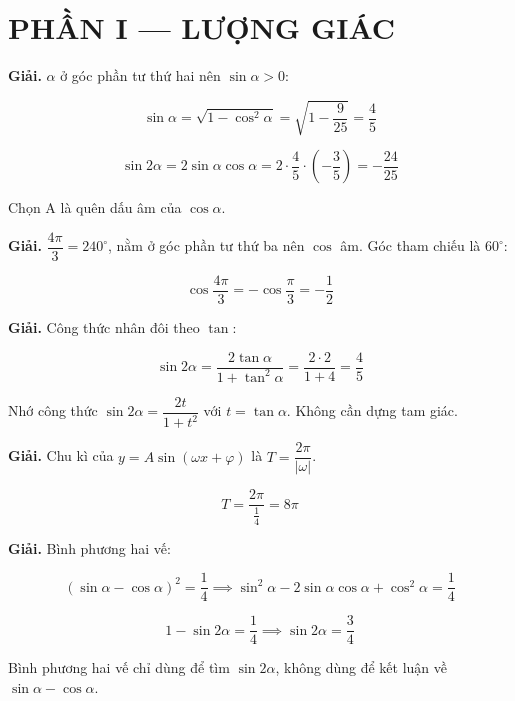 \documentclass[11pt, a4paper]{article}
\begin{document}
\section{PHẦN I — LƯỢNG GIÁC}

\begin{dapan}[1 — Đáp án B]

\textbf{Giải.} $\alpha$ ở góc phần tư thứ hai nên $\sin\alpha > 0$:

$$\sin\alpha = \sqrt{1 - \cos^2\alpha} = \sqrt{1 - \dfrac{9}{25}} = \dfrac{4}{5}$$

$$\sin 2\alpha = 2\sin\alpha\cos\alpha = 2 \cdot \dfrac{4}{5} \cdot \left(-\dfrac{3}{5}\right) = -\dfrac{24}{25}$$

 Chọn A là quên dấu âm của $\cos\alpha$.


\end{dapan}
\vspace{0.3cm}
\begin{dapan}[2 — Đáp án C]

\textbf{Giải.} $\dfrac{4\pi}{3} = 240^\circ$, nằm ở góc phần tư thứ ba nên $\cos$ âm. Góc tham chiếu là $60^\circ$:

$$\cos\dfrac{4\pi}{3} = -\cos\dfrac{\pi}{3} = -\dfrac{1}{2}$$


\end{dapan}
\vspace{0.3cm}
\begin{dapan}[3 — Đáp án A]

\textbf{Giải.} Công thức nhân đôi theo $\tan$:

$$\sin 2\alpha = \dfrac{2\tan\alpha}{1 + \tan^2\alpha} = \dfrac{2 \cdot 2}{1 + 4} = \dfrac{4}{5}$$

 Nhớ công thức $\sin 2\alpha = \dfrac{2t}{1+t^2}$ với $t = \tan\alpha$. Không cần dựng tam giác.


\end{dapan}
\vspace{0.3cm}
\begin{dapan}[4 — Đáp án D]

\textbf{Giải.} Chu kì của $y = A\sin(\omega x + \varphi)$ là $T = \dfrac{2\pi}{\lvert \omega \rvert}$.

$$T = \dfrac{2\pi}{\frac{1}{4}} = 8\pi$$


\end{dapan}
\vspace{0.3cm}
\begin{dapan}[5 — Đáp án B]

\textbf{Giải.} Bình phương hai vế:

$$(\sin\alpha - \cos\alpha)^2 = \dfrac{1}{4} \implies \sin^2\alpha - 2\sin\alpha\cos\alpha + \cos^2\alpha = \dfrac{1}{4}$$

$$1 - \sin 2\alpha = \dfrac{1}{4} \implies \sin 2\alpha = \dfrac{3}{4}$$

 Bình phương hai vế chỉ dùng để tìm $\sin 2\alpha$, không dùng để kết luận về $\sin\alpha - \cos\alpha$.


\end{dapan}
\end{document}
